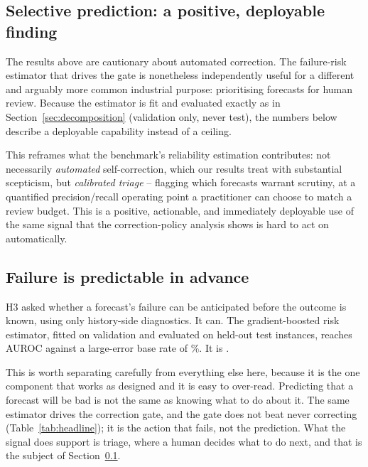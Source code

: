\subsection{Selective prediction: a positive, deployable finding}
\label{sec:triage}

The results above are cautionary about automated correction. The failure-risk estimator
that drives the gate is nonetheless independently useful for a different and arguably
more common industrial purpose: prioritising forecasts for human review. Because the
estimator is fit and evaluated exactly as in Section~\ref{sec:decomposition} (validation
only, never test), the numbers below describe a deployable capability instead of a
ceiling.

\begin{table}[htbp]
\centering
\caption{Selective-prediction value of the failure-risk estimator (AUROC
$=\triageauroc$, base rate of large errors $=\triagebaserate\%$). Reviewing the
riskiest 10\% of forecasts catches roughly a third of all large errors at two-thirds
precision -- a $\triageliftPOneZero\times$ enrichment over reviewing at random.}
\label{tab:triage}
\small
\fittable{}
\end{table}

This reframes what the benchmark's reliability estimation contributes: not necessarily
\emph{automated} self-correction, which our results treat with substantial scepticism,
but \emph{calibrated triage} -- flagging which forecasts warrant scrutiny, at a
quantified precision/recall operating point a practitioner can choose to match a review
budget. This is a positive, actionable, and immediately deployable use of the same
signal that the correction-policy analysis shows is hard to act on automatically.

\subsection{Failure is predictable in advance}

H3 asked whether a forecast's failure can be anticipated before the outcome is known,
using only history-side diagnostics. It can. The gradient-boosted risk estimator,
fitted on validation and evaluated on held-out test instances, reaches AUROC
\triageauroc{} against a large-error base rate of \triagebaserate\%. It is
\textbf{\verdictHThree}.

This is worth separating carefully from everything else here, because it is the one
component that works as designed and it is easy to over-read. Predicting that a
forecast will be bad is not the same as knowing what to do about it. The same
estimator drives the correction gate, and the gate does not beat never correcting
(Table~\ref{tab:headline}); it is the action that fails, not the prediction. What the
signal does support is triage, where a human decides what to do next, and that is the
subject of Section~\ref{sec:triage}.

